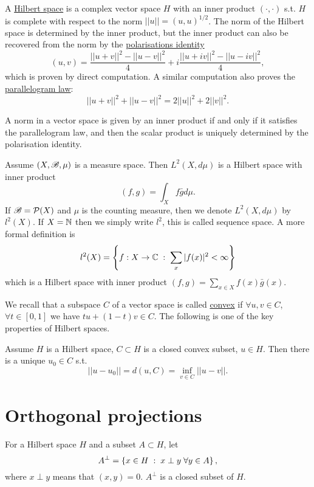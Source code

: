 \begin{definition}
    A \underline{Hilbert space} is a complex vector space $H$ with an inner product $(\cdot,\cdot)$ s.t. $H$ is complete with respect to the norm $||u||=(u,u)^{1/2}$.
    The norm of the Hilbert space is determined by the inner product, but the inner product can also be recovered from the norm by the \underline{polarisations identity}
    $$(u,v) = \frac{||u+v||^2-||u-v||^2}{4}+i\frac{||u+iv||^2-||u-iv||^2}{4},$$
    which is proven by direct computation. A similar computation also proves the \underline{parallelogram law}:
    $$||u+v||^2 +||u-v||^2 = 2||u||^2 + 2||v||^2.$$

\end{definition}

\begin{remark}
    A norm in a vector space is given by an inner product if and only if it satisfies the parallelogram law, and then the scalar product is uniquely determined by the polarisation identity.
\end{remark}
\begin{remark}
    Assume $(X,\mathscr{B},\mu)$ is a measure space. Then $L^2(X,d\mu)$ is a Hilbert space with inner product $$(f,g)=\int_X f\bar g d\mu.$$
    If $\mathscr{B}=\mathcal P(X)$ and $\mu$ is the counting measure, then we denote $L^2(X,d\mu)$ by $ l^2(X)$. If $X=\mathbb{N}$ then we simply write $l^2$, this is called sequence space. 
    A more formal definition is 
    $$l^2(X) = \left\{ f:X\rightarrow\mathbb{C} \hspace{1mm} :\hspace{1mm} \sum_{x}|f(x)|^2<\infty \right\}$$
    which is a Hilbert space with inner product $(f,g) = \sum_{x\in X}f(x)\bar g(x)$.
\end{remark}

We recall that a subspace $C$ of a vector space is called \underline{convex} if $\forall u,v\in C$, $\forall t\in[0,1]$ we have $tu+(1-t)v\in C$. 
The following is one of the key properties of Hilbert spaces. 
\begin{theorem}
    Assume $H$ is a Hilbert space, $C\subset H$ is a closed convex subset, $u\in H$. Then there is a unique $u_0\in C$ s.t. 
    $$||u-u_0|| = d(u,C) = \inf_{v\in C}||u-v||.$$ 
\end{theorem}

\section*{Orthogonal projections}
For a Hilbert space $H$ and a subset $A\subset H$, let $$A^\perp = \left\{ x\in H\hspace{1mm} :\hspace{1mm} x\perp y\hspace{1mm}\forall y\in A\right\},$$
where $x\perp y$ means that $(x,y)=0$. $A^\perp$ is a closed subset of $H$.

